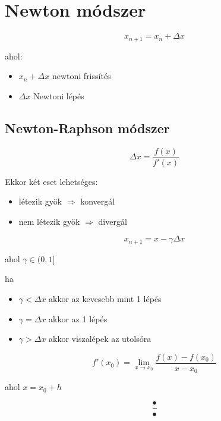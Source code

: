 \documentclass{article}
\begin{document}
\section{Newton módszer}

\begin{equation}
x_{n+1} = x_n +\Delta x
\end{equation}

ahol:
\begin{itemize}
\item $x_n + \Delta x$ newtoni frissítés 
\item $\Delta x$ Newtoni lépés
\end{itemize}

\subsection{Newton-Raphson módszer}

\begin{equation}
\Delta x = \dfrac{f(x)}{f'(x)}
\end{equation}

Ekkor két eset lehetséges:
\begin{itemize}
\item létezik gyök $\Rightarrow $ konvergál
\item nem létezik gyök $\Rightarrow $ divergál
\end{itemize}

\begin{equation}
x_{n+1} = x- \gamma \Delta x  
\end{equation}

ahol $ \gamma \in (0,1]$

ha
\begin{itemize}
\item $\gamma < \Delta x $ akkor az kevesebb mint 1 lépés
\item $\gamma = \Delta x $ akkor az 1 lépés
\item $\gamma > \Delta x $ akkor viszalépek az utolsóra
\end{itemize}

\begin{equation}
f'( x_0 ) = \lim_{x \to x_0 } \dfrac{f(x)-f( x_0 )}{ x - x_0 }
\end{equation}

ahol $x = x_0 +h $

\begin{equation}
\dfrac{•}{•}
\end{equation}
\end{document}
